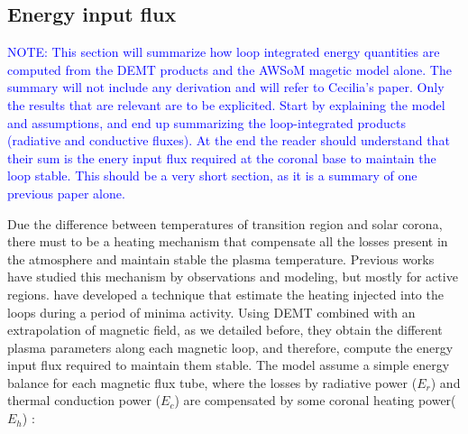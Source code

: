 \documentclass[namedreferences]{solarphysics}
\def\notebyalbert#1{\textcolor{blue}{NOTE: #1}}
\begin{document}
\begin{article}
\subsection{{Energy input flux}}\label{energia} 

\noindent\notebyalbert{This section will summarize how loop integrated energy quantities are computed from the DEMT products and the AWSoM magetic model alone. The summary will not include any derivation and will refer to Cecilia's paper. Only the results that are relevant are to be explicited. Start by explaining the model and assumptions, and end up summarizing the loop-integrated products (radiative and conductive fluxes). At the end the reader should understand that their sum is the enery input flux required at the coronal base to maintain the loop stable. This should be a very short section, as it is a summary of one previous paper alone.}


Due the difference between temperatures of transition region and solar corona, there must to be a heating mechanism that compensate all the losses present in the atmosphere and maintain stable the plasma temperature. Previous works have studied this mechanism by observations and modeling, but mostly for active regions. \citet{maccormack_2017} have developed a technique that estimate the heating injected into the loops during a period of minima activity. Using DEMT combined with an extrapolation of magnetic field, as we detailed before, they obtain the different plasma parameters along each magnetic loop, and therefore, compute the energy input flux required to maintain them stable.
The model assume a simple energy balance for each magnetic flux tube, where the losses by radiative power ($E_r$) and thermal conduction power ($E_c$) are compensated by some coronal heating power($E_h$) \citep{aschwanden_2004}:


\end{article}
\end{document}

